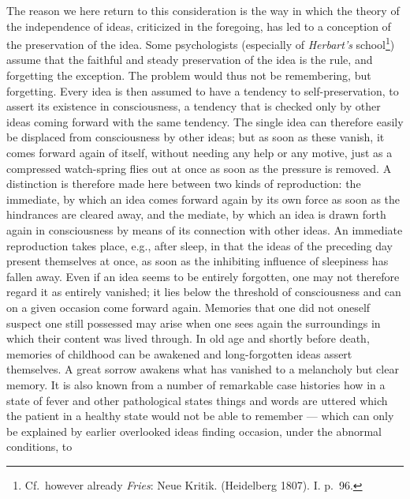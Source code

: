 \documentclass[12pt,a4paper]{book}
\newcommand{\opage}[1]{\marginnote{\footnotesize\textit{[#1]}}}
\begin{document}
The reason we here return to this consideration is the way in which the
theory of the independence of ideas, criticized in the foregoing, has led
to a conception of the preservation of the idea. Some psychologists
(especially of \emph{Herbart's}
school\footnote{Cf.\ however already \emph{Fries}: Neue Kritik.
(Heidelberg 1807). I. p.~96.}) assume that the faithful and steady
preservation of the idea is the rule, and forgetting the exception. The
problem would thus not be remembering, but forgetting. Every idea is then
assumed to have a tendency to self-preservation, to assert its existence
in consciousness, a tendency that is checked only by other ideas coming
forward with the same tendency. The single idea can therefore easily be
displaced from consciousness by other ideas; but as soon as these vanish,
it comes forward again of itself, without needing any help or any motive,
just as a compressed watch-spring flies out at once as soon as the
pressure is removed. A distinction is therefore made here between two
kinds of reproduction: the immediate, by which an idea comes forward again
by its own force as soon as the hindrances are cleared away, and the
mediate, by which an idea is drawn forth again in consciousness by means
of its connection with other ideas. An immediate reproduction takes place,
e.g., after sleep, in that the ideas of the preceding day present
themselves at once, as soon as the inhibiting influence of sleepiness has
fallen away. Even if an idea seems to be entirely forgotten, one may not
therefore regard it as entirely vanished; it lies below the threshold of
consciousness and can on a given occasion come forward again. Memories
that one did not
\opage{174}oneself suspect one still possessed may arise when one sees
again the surroundings in which their content was lived through. In old
age and shortly before death, memories of childhood can be awakened and
long-forgotten ideas assert themselves. A great sorrow awakens what has
vanished to a melancholy but clear memory. It is also known from a number
of remarkable case histories how in a state of fever and other
pathological states things and words are uttered which the patient in a
healthy state would not be able to remember --- which can only be
explained by earlier overlooked ideas finding occasion, under the abnormal
conditions, to
\end{document}
